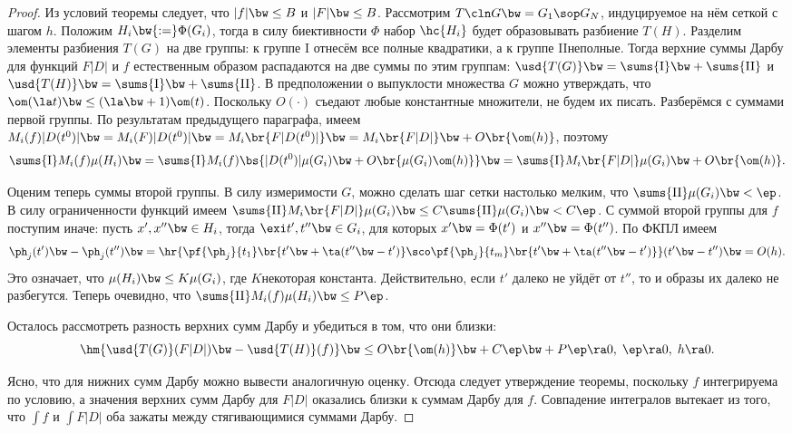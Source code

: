 \documentclass[a4paper]{article}
\newcommand{\ppht}[2]{\pf{\ph_{{#1}}}{t_{{#2}}}}
\newcommand{\sumfi}{\sums{\mathrm{I}}}
\newcommand{\sumse}{\sums{\mathrm{II}}}
\begin{document}
\begin{proof}
Из условий теоремы следует, что $|f| \bw\le B$ и $|F| \bw\le B$. Рассмотрим $T\cln G \bw= G_1\sop G_N$,
индуцируемое на нём сеткой с шагом $h$. Положим $H_i \bw{:=} \Phi(G_i)$, тогда в силу биективности
$\Phi$ набор $\hc{H_i}$ будет образовывать разбиение $T(H)$. Разделим элементы разбиения $T(G)$ на
две группы: к группе I отнесём все полные квадратики, а к группе II\т неполные. Тогда верхние
суммы Дарбу для функций $F|D|$ и $f$ естественным образом распадаются на две суммы по этим группам:
$\usd{T(G)} \bw= \sumfi \bw+ \sumse$ и $\usd{T(H)} \bw= \sumfi \bw+ \sumse$. В предположении о выпуклости
множества $G$ можно утверждать, что $\om(\la t) \bw\le (\la \bw+ 1)\om(t)$. Поскольку $O(\cdot)$ съедают
любые константные множители, не будем их писать. Разберёмся с суммами первой группы. По результатам
предыдущего параграфа, имеем $M_i(f)|D(t^0)| \bw= M_i(F)|D(t^0)| \bw= M_i\br{F|D(t^0)|} \bw= M_i\br{F|D|}
\bw+ O\br{\om(h)}$, поэтому
$$\sumfi M_i(f) \mu(H_i) \bw= \sumfi M_i(f)\bs{ |D(t^0)|\mu(G_i) \bw+ O\br{\mu(G_i)\om(h)} } \bw=
\sumfi M_i\br{F|D|}\mu(G_i) \bw+ O\br{\om(h)}.$$

Оценим теперь суммы второй группы. В силу измеримости $G$, можно сделать шаг сетки настолько
мелким, что $\sumse \mu(G_i) \bw< \ep$. В силу ограниченности функций имеем $\sumse
M_i\br{F|D|}\mu(G_i) \bw\le C\sumse \mu(G_i) \bw< C\ep$. С суммой второй группы для $f$ поступим иначе:
пусть $x', x'' \bw\in H_i$, тогда $\exi t',t'' \bw\in G_i$, для которых $x' \bw= \Phi(t')$ и $x'' \bw=
\Phi(t'')$. По ФКПЛ имеем
$$\ph_j(t') \bw- \ph_j(t'') \bw= \hr{\ppht j1\br{t' \bw+ \ta(t''\bw-t')} \sco \ppht jm
\br{t' \bw+ \ta(t''\bw-t')}}(t' \bw- t'') \bw= O(h).$$
Это означает, что $\mu(H_i) \bw\le K\mu(G_i)$, где
$K$\т некоторая константа. Действительно, если $t'$ далеко не уйдёт от $t''$, то и образы их
далеко не разбегутся. Теперь очевидно, что $\sumse M_i(f)\mu(H_i) \bw\le P\ep$.

Осталось рассмотреть разность верхних сумм Дарбу и убедиться в том, что они близки:
$$\hm{\usd{T(G)}(F|D|)\bw- \usd{T(H)}(f)} \bw\le O\br{\om(h)} \bw+ C\ep \bw+ P\ep \ra 0, \; \ep \ra 0,\; h \ra 0.$$

Ясно, что для нижних сумм Дарбу можно вывести аналогичную оценку. Отсюда следует утверждение
теоремы, поскольку $f$ интегрируема по условию, а значения верхних сумм Дарбу для $F|D|$ оказались
близки к суммам Дарбу для $f$. Совпадение интегралов вытекает из того, что $\int f$ и $\int F|D|$
оба зажаты между стягивающимися суммами Дарбу.
\end{proof}
\end{document}

